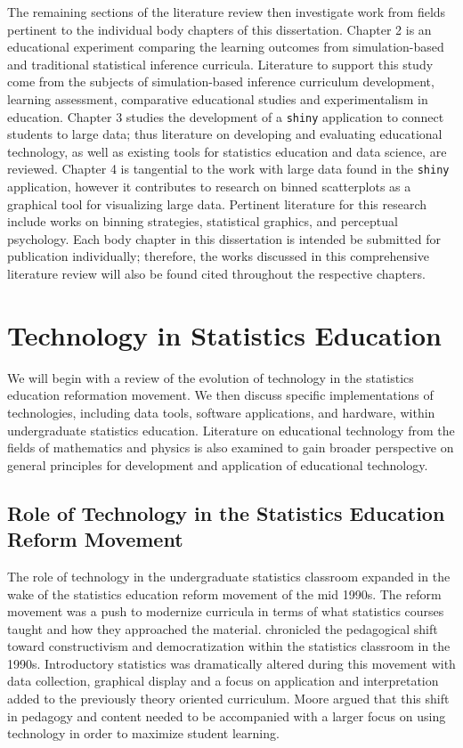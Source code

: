 \documentclass[11pt]{isuthesis}
\begin{document}
The remaining sections of the literature review then investigate work from fields pertinent to the individual body chapters of this dissertation. Chapter 2 is an educational experiment comparing the learning outcomes from simulation-based and traditional statistical inference curricula. Literature to support this study come from the subjects of simulation-based inference curriculum development, learning assessment, comparative educational studies and experimentalism in education. Chapter 3 studies the development of a \texttt{shiny} \citep{shiny} application to connect students to large data; thus literature on developing and evaluating educational technology, as well as existing tools for statistics education and data science, are reviewed. Chapter 4 is tangential to the work with large data found in the \texttt{shiny} application, however it contributes to research on binned scatterplots as a graphical tool for visualizing large data. Pertinent literature for this research include works on binning strategies, statistical graphics, and perceptual psychology. Each body chapter in this dissertation is intended be submitted for publication individually; therefore, the works discussed in this comprehensive literature review will also be found cited throughout the respective chapters.

\section{Technology in Statistics Education}
\label{EdTech}

We will begin with a review of the evolution of technology in the statistics education reformation movement. We then discuss specific implementations of technologies, including data tools, software applications, and hardware, within undergraduate statistics education. Literature on educational technology from the fields of mathematics and physics is also examined to gain broader perspective on general principles for development and application of educational technology.  

\subsection{Role of Technology in the Statistics Education Reform Movement}

The role of technology in the undergraduate statistics classroom expanded in the wake of the statistics education reform movement of the mid 1990s. The reform movement was a push to modernize curricula in terms of  what statistics courses taught and how they approached the material. \citet{Moore1997} chronicled the pedagogical shift toward constructivism and democratization within the statistics classroom in the 1990s. Introductory statistics was dramatically altered during this movement with data collection, graphical display and a focus on application and interpretation added to the previously theory oriented curriculum. Moore argued that this shift in pedagogy and content needed to be accompanied with a larger focus on using technology in order to maximize student learning. 
\end{document}
